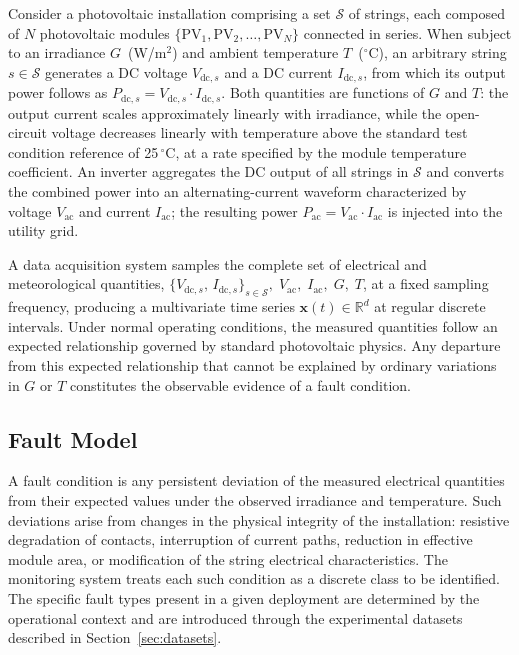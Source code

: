 Consider a photovoltaic installation comprising a set $\mathcal{S}$ of strings, each composed of $N$ photovoltaic modules $\{\mathrm{PV}_1, \mathrm{PV}_2, \ldots, \mathrm{PV}_N\}$ connected in series. When subject to an irradiance $G$~(W/m$^2$) and ambient temperature $T$~($^\circ$C), an arbitrary string $s \in \mathcal{S}$ generates a DC voltage $V_{\mathrm{dc},s}$ and a DC current $I_{\mathrm{dc},s}$, from which its output power follows as $P_{\mathrm{dc},s} = V_{\mathrm{dc},s} \cdot I_{\mathrm{dc},s}$. Both quantities are functions of $G$ and $T$: the output current scales approximately linearly with irradiance, while the open-circuit voltage decreases linearly with temperature above the standard test condition reference of 25\,$^\circ$C, at a rate specified by the module temperature coefficient. An inverter aggregates the DC output of all strings in $\mathcal{S}$ and converts the combined power into an alternating-current waveform characterized by voltage $V_{\mathrm{ac}}$ and current $I_{\mathrm{ac}}$; the resulting power $P_{\mathrm{ac}} = V_{\mathrm{ac}} \cdot I_{\mathrm{ac}}$ is injected into the utility grid.

A data acquisition system samples the complete set of electrical and meteorological quantities, $\{V_{\mathrm{dc},s},\, I_{\mathrm{dc},s}\}_{s \in \mathcal{S}},\; V_{\mathrm{ac}},\; I_{\mathrm{ac}},\; G,\; T$, at a fixed sampling frequency, producing a multivariate time series $\mathbf{x}(t) \in \mathbb{R}^d$ at regular discrete intervals. Under normal operating conditions, the measured quantities follow an expected relationship governed by standard photovoltaic physics. Any departure from this expected relationship that cannot be explained by ordinary variations in $G$ or $T$ constitutes the observable evidence of a fault condition.

\subsection{Fault Model}

A fault condition is any persistent deviation of the measured electrical quantities from their expected values under the observed irradiance and temperature. Such deviations arise from changes in the physical integrity of the installation: resistive degradation of contacts, interruption of current paths, reduction in effective module area, or modification of the string electrical characteristics. The monitoring system treats each such condition as a discrete class to be identified. The specific fault types present in a given deployment are determined by the operational context and are introduced through the experimental datasets described in Section~\ref{sec:datasets}.

